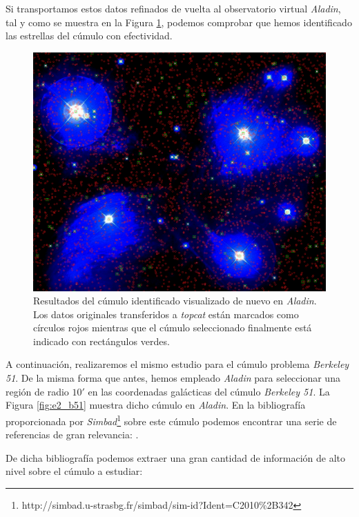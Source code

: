 \documentclass[a4paper,fleqn,usenatbib]{mnras}
\begin{document}
Si transportamos estos datos refinados de vuelta al observatorio virtual \emph{Aladin}, tal y como se muestra en la Figura \ref{fig:e2_final_m45}, podemos comprobar que hemos identificado las estrellas del cúmulo con efectividad.

\begin{figure}
  \includegraphics[width=\linewidth]{img/m45_cumulo_def}
  \caption{Resultados del cúmulo identificado visualizado de nuevo en \emph{Aladin}. Los datos originales transferidos a \emph{topcat} están marcados como círculos rojos mientras que el cúmulo seleccionado finalmente está indicado con rectángulos verdes.}
  \label{fig:e2_final_m45}
\end{figure}

A continuación, realizaremos el mismo estudio para el cúmulo problema \emph{Berkeley 51}. De la misma forma que antes, hemos empleado \emph{Aladin} para seleccionar una región de radio $10'$ en las coordenadas galácticas del cúmulo \emph{Berkeley 51}. La Figura \ref{fig:e2_b51} muestra dicho cúmulo en \emph{Aladin}. En la bibliografía proporcionada por \emph{Simbad}\footnote{http://simbad.u-strasbg.fr/simbad/sim-id?Ident=C2010\%2B342} sobre este cúmulo podemos encontrar una serie de referencias de gran relevancia: \cite{Negueruela2018,Lohr2018,Tadross2008,Ruprecth1966}.

De dicha bibliografía podemos extraer una gran cantidad de información de alto nivel sobre el cúmulo a estudiar:
\end{document}
